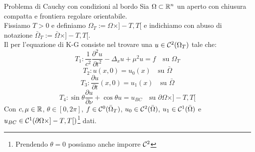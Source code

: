 \documentclass{book}
\begin{document}
\begin{definition}{Problema di Cauchy con condizioni al bordo}{}
    Sia $\Omega \subset \mathbb{R}^n$ un aperto con chiusura compatta e frontiera regolare orientabile.\\
    Fissiamo $T>0$ e definiamo $\Omega_T :=\Omega\times ]-T,T[$ e indichiamo con abuso di notazione $\bar{\Omega}_T:=\bar{\Omega}\times ]-T,T[$.\\
    Il  per l'equazione di K-G consiste nel trovare una $u\in \mathcal{C}^2(\Omega_T)$ tale che:
    \[T_1 : \frac{1}{c^2}\frac{\partial^2 u}{\partial t^2} - \Delta_x u + \mu^2 u = f \quad \text{su }\Omega_T\]
    \[T_2 : u(x,0) = u_0(x) \quad \text{su }\bar{\Omega}\]
    \[T_3 : \frac{\partial u}{\partial t}(x,0) = u_1(x)\quad \text{su }\bar{\Omega}\]
    \[T_4 : \sin\theta \frac{\partial u}{\partial \nu} + \cos\theta u = u_{BC} \quad \text{su } \partial\Omega \times ]-T,T[\]
    Con $c,\mu \in \mathbb{R}$, $\theta \in [0,2\pi]$, $f \in \mathcal{C}^0(\bar{\Omega}_T)$, $u_0 \in \mathcal{C}^2(\bar{\Omega})$, $u_1 \in \mathcal{C}^1(\bar{\Omega})$ e $u_{BC} \in \mathcal{C}^1(\partial\Omega \times ]-T,T[)$\footnote{Prendendo $\theta = 0$ possiamo anche imporre $\mathcal{C}^2$} dati.
\end{definition}
\end{document}
